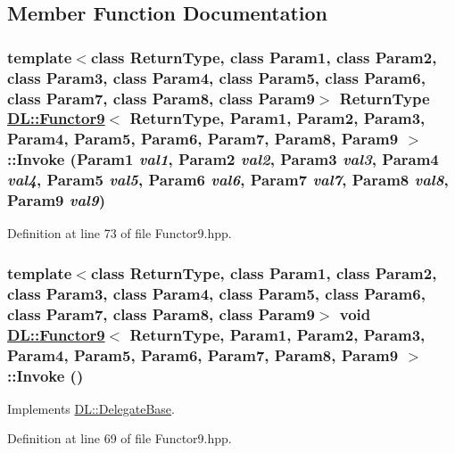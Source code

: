 \subsection{Member Function Documentation}
\hypertarget{classDL_1_1Functor9_a3}{
\subsubsection[Invoke]{\setlength{\rightskip}{0pt plus 5cm}template$<$class Return\-Type, class Param1, class Param2, class Param3, class Param4, class Param5, class Param6, class Param7, class Param8, class Param9$>$ Return\-Type \hyperlink{classDL_1_1Functor9}{DL::Functor9}$<$ Return\-Type, Param1, Param2, Param3, Param4, Param5, Param6, Param7, Param8, Param9 $>$::Invoke (Param1 {\em val1}, Param2 {\em val2}, Param3 {\em val3}, Param4 {\em val4}, Param5 {\em val5}, Param6 {\em val6}, Param7 {\em val7}, Param8 {\em val8}, Param9 {\em val9})}}
\label{classDL_1_1Functor9_a3}




Definition at line 73 of file Functor9.hpp.\hypertarget{classDL_1_1Functor9_a2}{
\subsubsection[Invoke]{\setlength{\rightskip}{0pt plus 5cm}template$<$class Return\-Type, class Param1, class Param2, class Param3, class Param4, class Param5, class Param6, class Param7, class Param8, class Param9$>$ void \hyperlink{classDL_1_1Functor9}{DL::Functor9}$<$ Return\-Type, Param1, Param2, Param3, Param4, Param5, Param6, Param7, Param8, Param9 $>$::Invoke ()}}
\label{classDL_1_1Functor9_a2}




Implements \hyperlink{classDL_1_1DelegateBase_a2}{DL::Delegate\-Base}.

Definition at line 69 of file Functor9.hpp.

